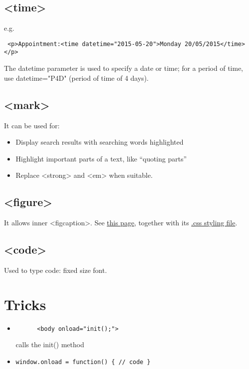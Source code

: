 \documentclass[a4paper,11pt]{book}
\begin{document}
    \section{<time>}
    e.g.
    \begin{verbatim} <p>Appointment:<time datetime="2015-05-20">Monday 20/05/2015</time></p> \end{verbatim}
    The datetime parameter is used to specify a date or time; for a period of time, use datetime="P4D"
    (period of time of 4 days).
    \section{<mark>}
    It can be used for:
    \begin{itemize}
        \item Display search results with searching words highlighted
        \item Highlight important parts of a text, like ``quoting parts''
        \item Replace <strong> and <em> when suitable.
    \end{itemize}

    \section{<figure>}
    It allows inner <figcaption>. See
    \href{http://pdata.altervista.org/HTML5/audio/audio_transitions.html}
    {this page}, together with its
    \href{http://pdata.altervista.org/HTML5/audio/audio_transitions.css}
    {.css styling file}.

	\section{<code>}
	Used to type code: fixed size font.

\chapter{Tricks}
\begin{itemize}
\item \begin{verbatim}
	  <body onload="init();">
	  \end{verbatim}	
	  calls the init() method
\item \texttt{window.onload = function() \{ // code \}}
\end{itemize}

\end{document}
